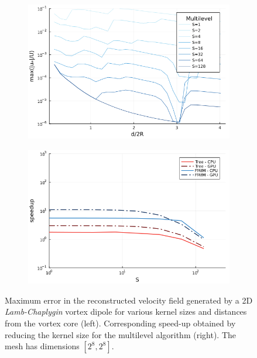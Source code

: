 \documentclass[final,1p,times]{elsarticle}
\begin{document}
\begin{figure}
    \centering
    \begin{subfigure}{.5\textwidth}
        \centering
        \includegraphics[width=\textwidth]{tex//fig/lamb_dipole_error_dists.png}
    \end{subfigure}%
    \begin{subfigure}{.5\textwidth}
        \centering
        \includegraphics[width=\textwidth]{tex/fig/lamb_dipole_speedup.png}
    \end{subfigure}
    \caption{Maximum error in the reconstructed velocity field generated by a 2D \emph{Lamb-Chaplygin} vortex dipole for various kernel sizes and distances from the vortex core (left). Corresponding speed-up obtained by reducing the kernel size for the multilevel algorithm (right). The mesh has dimensions $[2^8,2^8]$.}
    \label{fig:error_lamb_2}
\end{figure}
\end{document}
